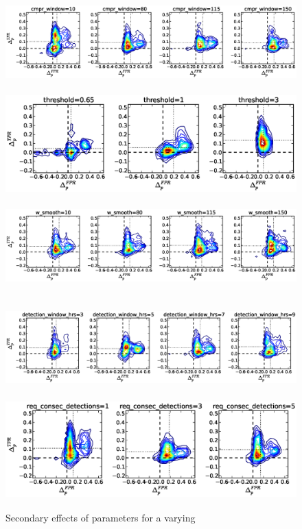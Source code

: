 \begin{figure}[!h]
\begin{center}
\includegraphics[height=1.5in]{../fig/final/delta_hist_sec/gamma/cmpr_window}
\includegraphics[height=1.5in]{../fig/final/delta_hist_sec/gamma/threshold}
\includegraphics[height=1.5in]{../fig/final/delta_hist_sec/gamma/w_smooth}
\includegraphics[height=1.5in]{../fig/final/delta_hist_sec/gamma/detection_window_hrs}
\includegraphics[height=1.5in]{../fig/final/delta_hist_sec/gamma/req_consec_detections}
\end{center}
\caption{\label{fig:delta_sec6} Secondary effects of parameters for a varying }
\end{figure}

